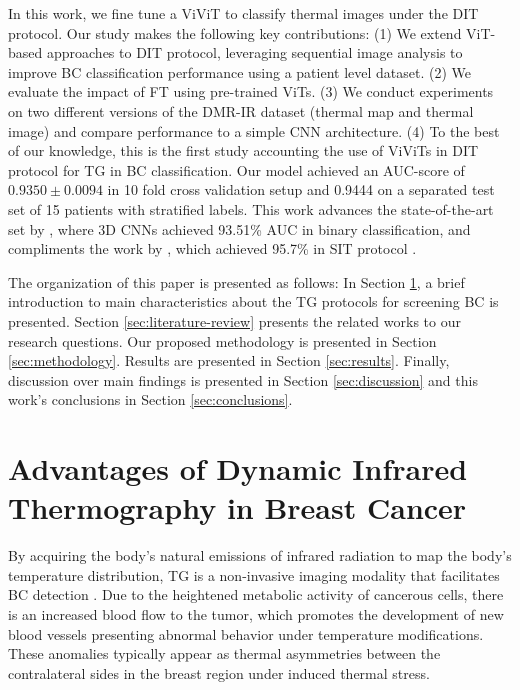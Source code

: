 \documentclass[runningheads]{llncs}
\begin{document}
In this work, we fine tune a \ac{ViViT} to classify thermal images
under the \ac{DIT} protocol. Our study makes the following key
contributions: (1) We extend \ac{ViT}-based approaches to \ac{DIT}
protocol, leveraging sequential image analysis to improve \ac{BC}
classification performance using a patient level dataset. (2) We
evaluate the impact of \ac{FT} using pre-trained \ac{ViTs}. (3) We
conduct experiments on two different versions of the DMR-IR dataset
(thermal map and thermal image) and compare performance to a simple
CNN architecture. (4) To the best of our knowledge, this is the first
study accounting the use of \ac{ViViTs} in \ac{DIT} protocol for
\ac{TG} in \ac{BC} classification. Our model achieved an
\ac{AUC}-score of $0.9350 \pm 0.0094$ in 10 fold cross validation
setup and 0.9444 on a separated test set of 15 patients with stratified
labels. This work advances the state-of-the-art set by
\cite{DeMatheus2023}, where 3D \ac{CNNs} achieved 93.51\% \ac{AUC} in
binary classification, and compliments the work by \cite{Garia2023},
which achieved 95.7\% in \ac{SIT} protocol \cite{Silva2014,VisualLab2014}.

The organization of this paper is presented as follows: In Section
\ref{sec:thermography}, a brief introduction to main characteristics
about the \ac{TG} protocols for screening BC is presented. Section
\ref{sec:literature-review} presents the related works to our research
questions. Our proposed methodology is presented in Section
\ref{sec:methodology}. Results are presented in Section
\ref{sec:results}. Finally, discussion over main findings is presented
in Section \ref{sec:discussion} and this work's conclusions in Section
\ref{sec:conclusions}.%

\section{Advantages of Dynamic Infrared Thermography in Breast Cancer}
\label{sec:thermography}
By acquiring the body's natural emissions of infrared radiation to map
the body's temperature distribution, \ac{TG} is a non-invasive imaging
modality that facilitates BC detection
\cite{Kennedy2009,Rakhunde2022,tsietso2022review}. Due to the
heightened metabolic activity of cancerous cells, there is an
increased blood flow to the tumor, which promotes the development of
new blood vessels presenting abnormal behavior under temperature
modifications. These anomalies typically appear as thermal
asymmetries between the contralateral sides in the breast region under
induced thermal stress. 
\end{document}
